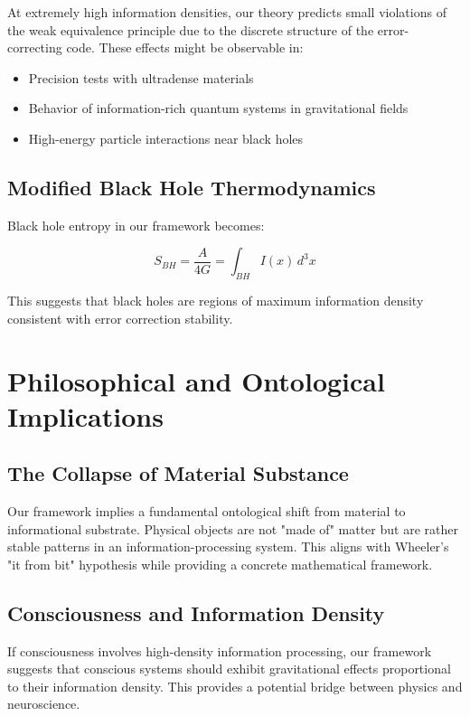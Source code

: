 \documentclass[12pt]{article}
\begin{document}
At extremely high information densities, our theory predicts small violations of the weak equivalence principle due to the discrete structure of the error-correcting code. These effects might be observable in:

\begin{itemize}
\item Precision tests with ultradense materials
\item Behavior of information-rich quantum systems in gravitational fields
\item High-energy particle interactions near black holes
\end{itemize}

\subsection{Modified Black Hole Thermodynamics}

Black hole entropy in our framework becomes:

\begin{equation}
S_{BH} = \frac{A}{4G} = \int_{BH} I(x) \, d^3x
\end{equation}

This suggests that black holes are regions of maximum information density consistent with error correction stability.

\section{Philosophical and Ontological Implications}

\subsection{The Collapse of Material Substance}

Our framework implies a fundamental ontological shift from material to informational substrate. Physical objects are not "made of" matter but are rather stable patterns in an information-processing system. This aligns with Wheeler's "it from bit" hypothesis while providing a concrete mathematical framework.

\subsection{Consciousness and Information Density}

If consciousness involves high-density information processing, our framework suggests that conscious systems should exhibit gravitational effects proportional to their information density. This provides a potential bridge between physics and neuroscience.
\end{document}

